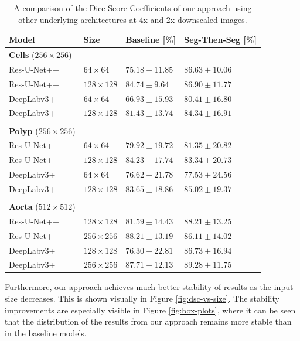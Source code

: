 \begin{table}[h]
\caption{A comparison of the Dice Score Coefficients of our approach using other underlying architectures at 4x and 2x downscaled images.\label{tab:other-sota}}
		\begin{tabularx}{\textwidth}{lCCC}
			\textbf{Model} & \textbf{Size} & \textbf{Baseline [\%]} & \textbf{Seg-Then-Seg [\%]}\\
\toprule
\textbf{Cells} ($256 \times 256$) & & & \\
\midrule
Res-U-Net++ & $64 \times 64$ & $75.18 \pm 11.85$ & $86.63 \pm 10.06$ \\
Res-U-Net++ & $128 \times 128$ & $84.74 \pm 9.64$ & $86.90 \pm 11.77$ \\
\midrule
DeepLabv3+ & $64 \times 64$ & $66.93 \pm 15.93$ & $80.41 \pm 16.80$ \\
DeepLabv3+ & $128 \times 128$ & $81.43 \pm 13.74$ & $84.34 \pm 16.91$ \\
\bottomrule \\
\toprule
\textbf{Polyp} ($256 \times 256$) & & & \\
\midrule
Res-U-Net++ & $64 \times 64$ & $79.92 \pm 19.72$ & $81.35 \pm 20.82$ \\
Res-U-Net++ & $128 \times 128$ & $84.23 \pm 17.74$ & $83.34 \pm 20.73$ \\
\midrule
DeepLabv3+ & $64 \times 64$ & $76.62 \pm 21.78$ & $77.53 \pm 24.56$ \\
DeepLabv3+ & $128 \times 128$ & $83.65 \pm 18.86$ & $85.02 \pm 19.37$ \\
\bottomrule \\
\toprule
\textbf{Aorta} ($512 \times 512$) & & & \\
\midrule
Res-U-Net++ & $128 \times 128$ & $81.59 \pm 14.43$ & $88.21 \pm 13.25$ \\
Res-U-Net++ & $256 \times 256$ & $88.21 \pm 13.19$ & $86.11 \pm 14.02$ \\
\midrule
DeepLabv3+ & $128 \times 128$ & $76.30 \pm 22.81$ & $86.73 \pm 16.94$ \\
DeepLabv3+ & $256 \times 256$ & $87.71 \pm 12.13$ & $89.28 \pm 11.75$ \\
\end{tabularx}
\end{table}

Furthermore, our approach achieves much better stability of results as the input size decreases. This is shown visually in Figure \ref{fig:dsc-vs-size}. The stability improvements are especially visible in Figure \ref{fig:box-plots}, where it can be seen that the distribution of the results from our approach remains more stable than in the baseline models.

